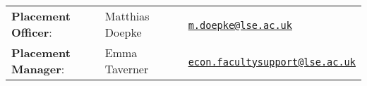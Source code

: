 \begin{tabular}{lll}
	
	\small \textbf{Placement Officer}:
	& \small Matthias Doepke
	& \small \textcolor{stlavender}{\faEnvelopeO}~~\href{mailto:m.doepke@lse.ac.uk}{\texttt{m.doepke@lse.ac.uk}}
	\\[0ex]
	
	\small \textbf{Placement Manager}:
	& \small Emma Taverner
	& \small \textcolor{stlavender}{\faEnvelopeO}~~\href{mailto:econ.facultysupport@lse.ac.uk}{\texttt{econ.facultysupport@lse.ac.uk}}
	
\end{tabular}